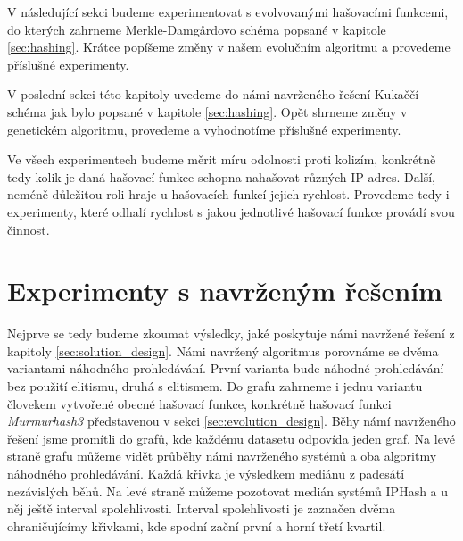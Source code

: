 V následující sekci budeme experimentovat s evolvovanými hašovacími funkcemi, do kterých zahrneme
Merkle-Damg\r{a}rdovo schéma popsané v kapitole \ref{sec:hashing}. Krátce popíšeme změny v našem
evolučním algoritmu a provedeme příslušné experimenty.

V poslední sekci této kapitoly uvedeme do námi navrženého řešení Kukaččí schéma jak bylo popsané
v kapitole \ref{sec:hashing}. Opět shrneme změny v genetickém algoritmu, provedeme a vyhodnotíme
příslušné experimenty.

Ve všech experimentech budeme měrit míru odolnosti proti kolizím, konkrétně tedy kolik je daná hašovací 
funkce schopna nahašovat různých IP adres. Další, neméně důležitou roli hraje u hašovacích funkcí jejich
rychlost. Provedeme tedy i experimenty, které odhalí rychlost s jakou jednotlivé hašovací funkce provádí svou
činnost. 

\section{Experimenty s navrženým řešením}
Nejprve se tedy budeme zkoumat výsledky, jaké poskytuje námi navržené řešení z kapitoly
 \ref{sec:solution_design}. Námi navržený algoritmus porovnáme se dvěma variantami náhodného prohledávání.
 První varianta bude náhodné prohledávání bez použití elitismu, druhá s elitismem. Do grafu zahrneme i jednu
 variantu človekem vytvořené obecné hašovací funkce, konkrétně hašovací funkci \textit{Murmurhash3} představenou
 v sekci \ref{sec:evolution_design}. Běhy námí navrženého řešení jsme promítli do grafů, kde každému
 datasetu odpovída jeden graf. Na levé straně grafu můžeme vidět průběhy námi navrženého systémů a oba
 algoritmy náhodného prohledávání. Každá křivka je výsledkem mediánu z padesátí nezávislých běhů. Na levé
 straně můžeme pozotovat medián systémů IPHash a u něj ještě interval spolehlivosti. Interval spolehlivosti
 je zaznačen dvěma ohraničujícímy křivkami, kde spodní zační první a horní třetí kvartil.


